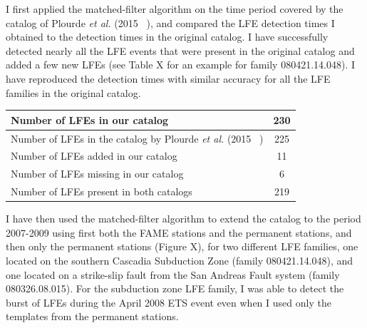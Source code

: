 \documentclass[letterpaper, 12pt]{article}
\begin{document}
I first applied the matched-filter algorithm on the time period covered by the catalog of Plourde \textit{et al.} (2015 ~\cite{PLO_2015}), and compared the LFE detection times I obtained to the detection times in the original catalog. I have successfully detected nearly all the LFE events that were present in the original catalog and added a few new LFEs (see Table X for an example for family 080421.14.048). I have reproduced the detection times with similar accuracy for all the LFE families in the original catalog.

\begin{center}
\begin{tabular}{| l | c |}
  \hline
  Number of LFEs in our catalog & 230 \\
  \hline
  Number of LFEs in the catalog by Plourde \textit{et al.} (2015 ~\cite{PLO_2015}) & 225 \\
  \hline
  Number of LFEs added in our catalog & 11 \\
  \hline
  Number of LFEs missing in our catalog & 6 \\
  \hline
  Number of LFEs present in both catalogs & 219 \\
  \hline
\end{tabular}
\captionsetup{type=table}
\end{center}

I have then used the matched-filter algorithm to extend the catalog to the period 2007-2009 using first both the FAME stations and the permanent stations, and then only the permanent stations (Figure X), for two different LFE families, one located on the southern Cascadia Subduction Zone (family 080421.14.048), and one located on a strike-slip fault from the San Andreas Fault system (family 080326.08.015). For the subduction zone LFE family, I was able to detect the burst of LFEs during the April 2008 ETS event even when I used only the templates from the permanent stations.
\end{document}
